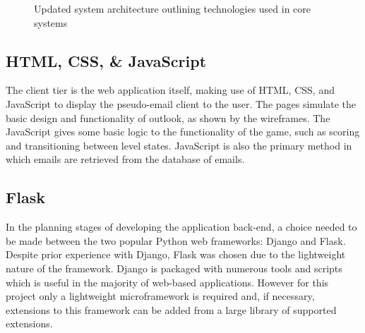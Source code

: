 \documentclass{l4proj}
\begin{document}
\begin{figure}[H]
    \centering
    \caption{Updated system architecture outlining technologies used in core systems}
    \label{fig:tech_arch} 
\end{figure}

\subsection{HTML, CSS, & JavaScript}
The client tier is the web application itself, making use of HTML, CSS, and JavaScript to display the pseudo-email client to the user. The pages simulate the basic design and functionality of outlook, as shown by the wireframes. The JavaScript gives some basic logic to the functionality of the game, such as scoring and transitioning between level states. JavaScript is also the primary method in which emails are retrieved from the database of emails.

\subsection{Flask}
In the planning stages of developing the application back-end, a choice needed to be made between the two popular Python web frameworks: Django and Flask. Despite prior experience with Django, Flask was chosen due to the lightweight nature of the framework. Django is packaged with numerous tools and scripts which is useful in the majority of web-based applications. However for this project only a lightweight microframework is required and, if necessary, extensions to this framework can be added from a large library of supported extensions. 
\end{document}
